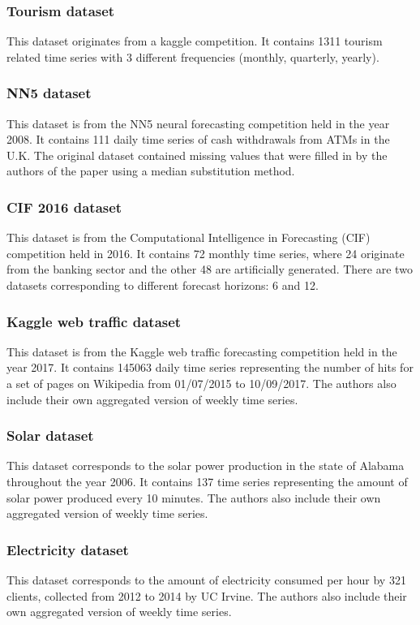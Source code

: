 \subsubsection{Tourism dataset}
This dataset originates from a kaggle competition. It contains 1311 tourism related time series with 3 different frequencies (monthly, quarterly, yearly).

\subsubsection{NN5 dataset}
This dataset is from the NN5 neural forecasting competition held in the year 2008. It contains 111 daily time series of cash withdrawals from ATMs in the U.K. The original dataset contained missing values that were filled in by the authors of the paper using a median substitution method.

\subsubsection{CIF 2016 dataset}
This dataset is from the Computational Intelligence in Forecasting (CIF) competition held in 2016. It contains 72 monthly time series, where 24 originate from the banking sector and the other 48 are artificially generated. There are two datasets corresponding to different forecast horizons: 6 and 12.

\subsubsection{Kaggle web traffic dataset}
This dataset is from the Kaggle web traffic forecasting competition held in the year 2017. It contains 145063 daily time series representing the number of hits for a set of pages on Wikipedia from 01/07/2015 to 10/09/2017. The authors also include their own aggregated version of weekly time series. 

\subsubsection{Solar dataset}
This dataset corresponds to the solar power production in the state of Alabama throughout the year 2006. It contains 137 time series representing the amount of solar power produced every 10 minutes. The authors also include their own aggregated version of weekly time series. 

\subsubsection{Electricity dataset}
This dataset corresponds to the amount of electricity consumed per hour by 321 clients, collected from 2012 to 2014 by UC Irvine. The authors also include their own aggregated version of weekly time series.

